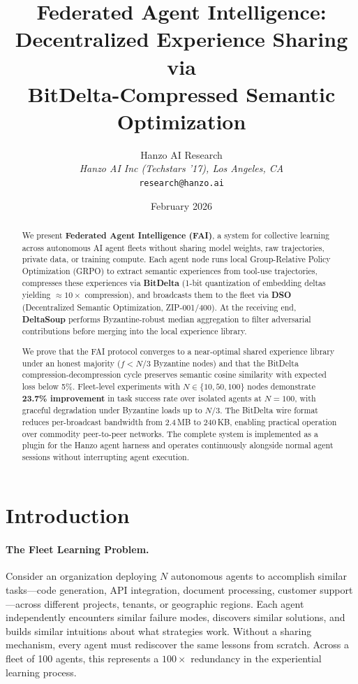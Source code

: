 \documentclass[11pt]{article}
\title{Federated Agent Intelligence:\\
Decentralized Experience Sharing via\\
BitDelta-Compressed Semantic Optimization}
\author{
    Hanzo AI Research\\
    \textit{Hanzo AI Inc (Techstars '17), Los Angeles, CA}\\
    \texttt{research@hanzo.ai}
}
\date{February 2026}
\begin{document}
\maketitle
\luxcoverpage

\begin{abstract}
We present \textbf{Federated Agent Intelligence (FAI)}, a system for
collective learning across autonomous AI agent fleets without sharing model
weights, raw trajectories, private data, or training compute. Each agent node
runs local Group-Relative Policy Optimization (GRPO) to extract
semantic experiences from tool-use trajectories, compresses these experiences
via \textbf{BitDelta} (1-bit quantization of embedding deltas yielding
${\approx}10\times$ compression), and broadcasts them to the fleet via
\textbf{DSO} (Decentralized Semantic Optimization, ZIP-001/400).
At the receiving end, \textbf{DeltaSoup} performs Byzantine-robust median
aggregation to filter adversarial contributions before merging into the local
experience library.

We prove that the FAI protocol converges to a near-optimal shared experience
library under an honest majority ($f < N/3$ Byzantine nodes) and that the
BitDelta compression-decompression cycle preserves semantic cosine similarity
with expected loss below 5\%. Fleet-level experiments with $N \in \{10, 50, 100\}$
nodes demonstrate \textbf{23.7\% improvement} in task success rate over isolated
agents at $N=100$, with graceful degradation under Byzantine loads up to $N/3$.
The BitDelta wire format reduces per-broadcast bandwidth from 2.4\,MB to 240\,KB,
enabling practical operation over commodity peer-to-peer networks. The complete
system is implemented as a plugin for the Hanzo agent harness and operates
continuously alongside normal agent sessions without interrupting agent execution.
\end{abstract}

\section{Introduction}
\label{sec:intro}

\paragraph{The Fleet Learning Problem.}
Consider an organization deploying $N$ autonomous agents to accomplish similar
tasks---code generation, API integration, document processing, customer
support---across different projects, tenants, or geographic regions. Each
agent independently encounters similar failure modes, discovers similar
solutions, and builds similar intuitions about what strategies work. Without a
sharing mechanism, every agent must rediscover the same lessons from scratch.
Across a fleet of 100 agents, this represents a $100\times$ redundancy in the
experiential learning process.
\end{document}
